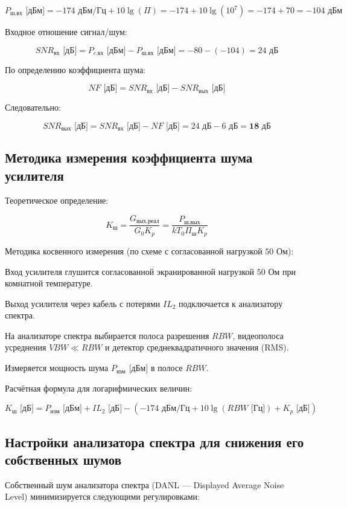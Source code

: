 $$P_{\text{ш.вх}}\text{ [дБм]} = -174\text{ дБм/Гц} + 10\lg(\Pi) = -174 + 10\lg(10^7) = -174 + 70 = -104\text{ дБм}$$

Входное отношение сигнал/шум:


$$SNR_{\text{вх}}\text{ [дБ]} = P_{c.\text{вх}}\text{ [дБм]} - P_{\text{ш.вх}}\text{ [дБм]} = -80 - (-104) = 24\text{ дБ}$$

По определению коэффициента шума:


$$NF\text{ [дБ]} = SNR_{\text{вх}}\text{ [дБ]} - SNR_{\text{вых}}\text{ [дБ]}$$


Следовательно:


$$SNR_{\text{вых}}\text{ [дБ]} = SNR_{\text{вх}}\text{ [дБ]} - NF\text{ [дБ]} = 24\text{ дБ} - 6\text{ дБ} = \mathbf{18\text{ дБ}}$$

\subsection {Методика измерения коэффициента шума усилителя}

Теоретическое определение:


$$K_{\text{ш}} = \frac{G_{\text{вых.реал}}}{G_0 K_p} = \frac{P_{\text{ш.вых}}}{k T_0 \Pi_{\text{ш}} K_p}$$

Методика косвенного измерения (по схеме с согласованной нагрузкой $50\text{ Ом}$):

Вход усилителя глушится согласованной экранированной нагрузкой $50\text{ Ом}$ при комнатной температуре.

Выход усилителя через кабель с потерями $IL_2$ подключается к анализатору спектра.

На анализаторе спектра выбирается полоса разрешения $RBW$, видеополоса усреднения $VBW \ll RBW$ и детектор среднеквадратичного значения (RMS).

Измеряется мощность шума $P_{\text{изм}}$ [дБм] в полосе $RBW$.

Расчётная формула для логарифмических величин:


$$K_{\text{ш}}\text{ [дБ]} = P_{\text{изм}}\text{ [дБм]} + IL_2\text{ [дБ]} - \left( -174\text{ дБм/Гц} + 10\lg(RBW\text{ [Гц]}) + K_p\text{ [дБ]} \right)$$

\subsection {Настройки анализатора спектра для снижения его собственных шумов}

Собственный шум анализатора спектра (DANL — Displayed Average Noise Level) минимизируется следующими регулировками:

